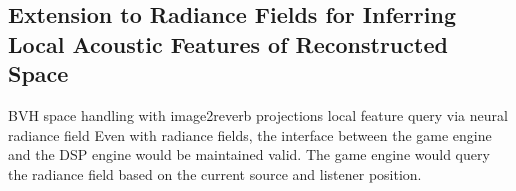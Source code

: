 \subsection{Extension to Radiance Fields for Inferring Local Acoustic Features of Reconstructed Space}

BVH space handling with image2reverb projections
local feature query via neural radiance field
Even with radiance fields, the interface between the game engine and the DSP engine would be maintained valid. The game engine would query the radiance field based on the current source and listener position.

